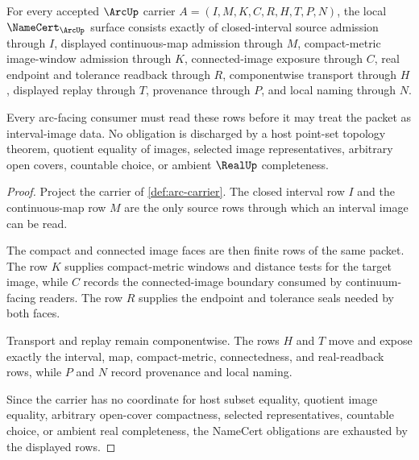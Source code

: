 \begin{theorem}
\label{thm:arc-namecert-obligations}
For every accepted $\ArcUp$ carrier $A=(I,M,K,C,R,H,T,P,N)$, the local $\NameCert_{\ArcUp}$ surface consists exactly of closed-interval source admission through $I$, displayed continuous-map admission through $M$, compact-metric image-window admission through $K$, connected-image exposure through $C$, real endpoint and tolerance readback through $R$, componentwise transport through $H$, displayed replay through $T$, provenance through $P$, and local naming through $N$.

Every arc-facing consumer must read these rows before it may treat the packet as interval-image data. No obligation is discharged by a host point-set topology theorem, quotient equality of images, selected image representatives, arbitrary open covers, countable choice, or ambient $\RealUp$ completeness.
\end{theorem}
\begin{proof}
Project the carrier of \autoref{def:arc-carrier}. The closed interval row $I$ and the continuous-map row $M$ are the only source rows through which an interval image can be read.

The compact and connected image faces are then finite rows of the same packet. The row $K$ supplies compact-metric windows and distance tests for the target image, while $C$ records the connected-image boundary consumed by continuum-facing readers. The row $R$ supplies the endpoint and tolerance seals needed by both faces.

Transport and replay remain componentwise. The rows $H$ and $T$ move and expose exactly the interval, map, compact-metric, connectedness, and real-readback rows, while $P$ and $N$ record provenance and local naming.

Since the carrier has no coordinate for host subset equality, quotient image equality, arbitrary open-cover compactness, selected representatives, countable choice, or ambient real completeness, the NameCert obligations are exhausted by the displayed rows.
\end{proof}

